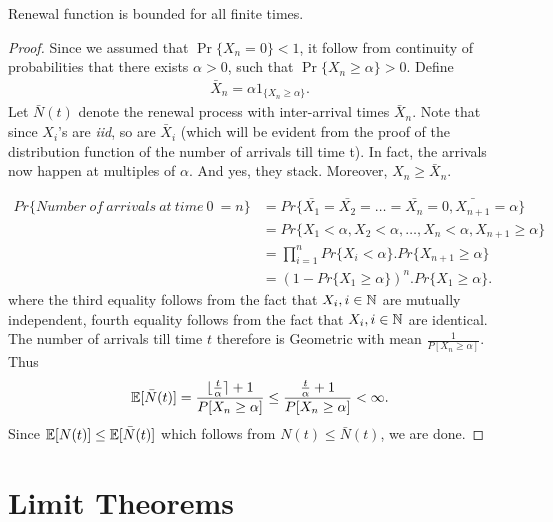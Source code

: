 \documentclass[a4paper,10pt, english]{article}
\begin{document}
\begin{prop} Renewal function is bounded for all finite times.
\end{prop}
\begin{proof}
	Since we assumed that $\Pr\{X_n = 0\} < 1$, it follow from continuity of probabilities that there exists $\alpha > 0$, such that $\Pr\{X_n \geq \alpha\} >0$. Define
	\begin{align*}
	\bar{X}_n = \alpha 1_{\{X_n \geq \alpha\}}.
	\end{align*}
	Let $\bar{N}(t)$ denote the renewal process with inter-arrival times $\bar{X}_n$. Note that since $X_i$'s are \emph{iid}, so are $\bar{X}_i$ (which will be evident from the proof of the distribution function of the number of arrivals till time t). In fact, the arrivals now happen at multiples of $\alpha$. And yes, they stack. Moreover, $X_n \geq \bar{X}_n$.
	
	\begin{align*}
	Pr\{Number ~of ~arrivals ~at ~time ~0 ~= n\} &= Pr\{\bar{X_1}=\bar{X_2}=\ldots=\bar{X_n}=0,\bar{X_{n+1}}=\alpha\} \\
	&= Pr\{X_1 < \alpha,X_2 < \alpha,\ldots,X_n < \alpha,X_{n+1} \geq \alpha\} \\
	&= \prod_{i=1}^{n} Pr\{X_i < \alpha\} . Pr\{X_{n+1} \geq \alpha \}  \\
	&= \left(1- Pr\{X_1 \geq \alpha \}\right) ^{n} . Pr\{X_1 \geq \alpha\}.
	\end{align*}
	where the third equality follows from the fact that $ X_i, i \in \mathbb{N}$ are mutually independent, fourth equality follows from the fact that $ X_i, i \in \mathbb{N}$ are identical.
	\\
	The number of arrivals till time $t$ therefore is Geometric with mean $\frac{1}{P[X_n \geq \alpha]}$. Thus 
	\begin{align*}
	\mathbb{E}[\bar{N}(t)] = \frac{\lfloor\frac{t}{\alpha} \rceil + 1}{P[X_n \geq \alpha]} \leq \frac{\frac{t}{\alpha} + 1}{P[X_n \geq \alpha]} < \infty.
	\end{align*}
	Since $\mathbb{E}[N(t)] \leq \mathbb{E}[\bar{N}(t)]$ which follows from $N(t) \leq \bar{N}(t)$, we are done.
\end{proof} 

\section{Limit Theorems}
\end{document}
